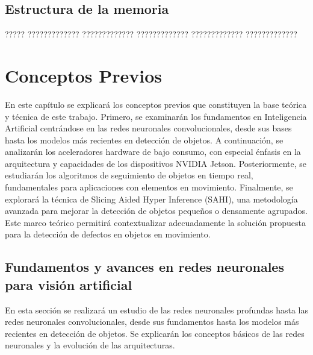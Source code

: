 \documentclass[11pt,spanish,listoffigures,listoftables]{tfgetsinf}
\begin{document}
\section{Estructura de la memoria}

????? ????????????? ????????????? ????????????? ????????????? ????????????? 




\chapter{Conceptos Previos}

En este capítulo se explicará los conceptos previos que constituyen la base teórica y técnica de este trabajo. Primero, se examinarán los fundamentos en Inteligencia Artificial centrándose en las redes neuronales convolucionales, desde sus bases hasta los modelos más recientes en detección de objetos. A continuación, se analizarán los aceleradores hardware de bajo consumo, con especial énfasis en la arquitectura y capacidades de los dispositivos NVIDIA Jetson. Posteriormente, se estudiarán los algoritmos de seguimiento de objetos en tiempo real, fundamentales para aplicaciones con elementos en movimiento. Finalmente, se explorará la técnica de Slicing Aided Hyper Inference (SAHI), una metodología avanzada para mejorar la detección de objetos pequeños o densamente agrupados. Este marco teórico permitirá contextualizar adecuadamente la solución propuesta para la detección de defectos en objetos en movimiento.

\section{Fundamentos y avances en redes neuronales para visión artificial}
En esta sección se realizará un estudio de las redes neuronales profundas hasta las redes neuronales convolucionales, desde sus fundamentos hasta los modelos más recientes en detección de objetos. Se explicarán los conceptos básicos de las redes neuronales y la evolución de las arquitecturas.
\end{document}
